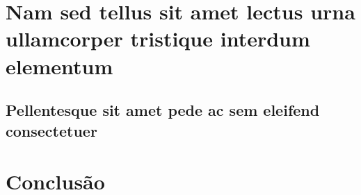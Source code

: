 \documentclass[
	12pt,				%
	openright,			%
	oneside,			%
	a4paper,			%
	english,			%
	brazil				%
	]{abntex2}
\begin{document}
\lipsum[21-22]

\chapter{Nam sed tellus sit amet lectus urna ullamcorper tristique interdum
elementum}

\section{Pellentesque sit amet pede ac sem eleifend consectetuer}

\lipsum[24]


\chapter{Conclusão}

\lipsum[31-33]

\postextual



%
%

\end{document}
